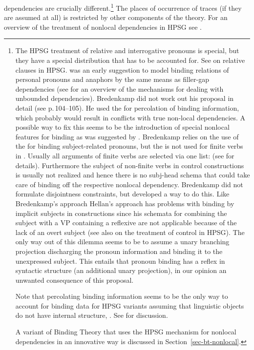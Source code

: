 \documentclass[output=paper
	        ,collection
	        ,collectionchapter
 	        ,biblatex
                ,babelshorthands
                ,newtxmath
                ,draftmode
                ,colorlinks, citecolor=brown
]{langscibook}
\begin{document}
dependencies are crucially different.\footnote{\label{binding-fn-percolation-of-indices}%
The HPSG treatment of relative and interrogative pronouns is special, but they have a special
distribution that has to be accounted for. See  on relative
clauses in HPSG. %
\citet[Section~7.2.3]{Bredenkamp96a} was an early suggestion to model binding relations of personal pronouns and anaphors by
the same means as filler-gap dependencies (see  for an overview of the
mechanisms for dealing with unbounded dependencies). Bredenkamp did not work out his proposal in detail (see
p.\,104--105). He used the \slashf for percolation of binding information, which probably would result in
conflicts with true non-local dependencies. A possible way to fix this seems to be the introduction of
special nonlocal features for binding as was suggested by \citet{Hellan2005a}. Bredenkamp relies on the use of the \subjf for binding
subject-related pronouns, but the \subjf is not used for finite verbs in . Usually all
arguments of finite verbs are selected via one list: \comps (see  for details). Furthermore the
subject of non-finite verbs in control constructions is usually not realized and hence there is no
subj-head schema that could take care of binding off the respective nonlocal dependency. Bredenkamp
did not formulate disjointness constraints, but \citet{Hellan2005a} developed a way to do this. Like
Bredenkamp's approach Hellan's approach has problems with binding by implicit subjects in 
constructions since his schemata for combining the subject with a VP containing a reflexive are not
applicable because of the lack of an overt subject (see also  on
the treatment of control in HPSG). The only way out of this dilemma seems to be to assume a unary
branching projection discharging the pronoun information and binding it to the unexpressed
subject. This entails that pronoun binding has a reflex in syntactic structure (an additional unary
projection), in our opinion an unwanted consequence of this proposal. 

Note that percolating binding information seems to be the only way
to account for binding data for HPSG variants assuming that linguistic objects do not have internal
structure, \eg \sbcg. See  for discussion.

A variant of Binding Theory that uses the HPSG mechanism for nonlocal dependencies in an innovative
way is discussed in Section~\ref{sec-bt-nonlocal}.%
} The places of occurrence of traces (if they are assumed at all)
is restricted by other components of the theory. For an overview of the treatment of nonlocal
dependencies in HPSG see .
\end{document}
